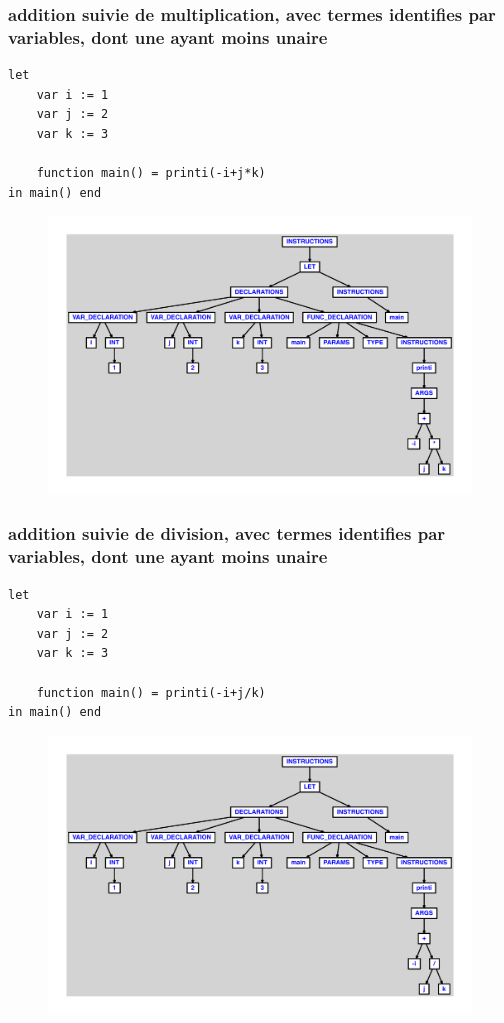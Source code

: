 \documentclass{article}
\begin{document}
\subsubsection{addition suivie de multiplication, avec termes identifies par variables, dont une ayant moins unaire}
\begin{lstlisting}
let
	var i := 1
	var j := 2
	var k := 3

	function main() = printi(-i+j*k)
in main() end
\end{lstlisting}
\newpage
\begin{figure}[H]
\centering
\includegraphics[max width=\textwidth]{ast/ast_81.pdf}
\end{figure}
\newpage
\subsubsection{addition suivie de division, avec termes identifies par variables, dont une ayant moins unaire}
\begin{lstlisting}
let
	var i := 1
	var j := 2
	var k := 3

	function main() = printi(-i+j/k)
in main() end
\end{lstlisting}
\newpage
\begin{figure}[H]
\centering
\includegraphics[max width=\textwidth]{ast/ast_82.pdf}
\end{figure}
\newpage
\end{document}
